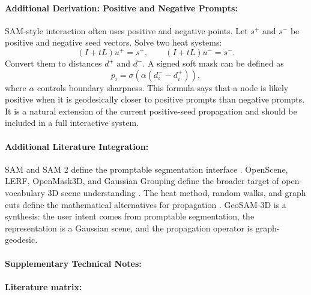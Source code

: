 \documentclass{article}
\begin{document}
\paragraph{Additional Derivation: Positive and Negative Prompts:}

SAM-style interaction often uses positive and negative points. Let $s^+$ and $s^-$ be positive and negative seed vectors. Solve two heat systems:
\begin{equation}
  (I+tL)u^+=s^+,\qquad (I+tL)u^-=s^-.
\end{equation}
Convert them to distances $d^+$ and $d^-$. A signed soft mask can be defined as
\begin{equation}
  p_i=\sigma\left(\alpha(d_i^- - d_i^+)\right),
\end{equation}
where $\alpha$ controls boundary sharpness. This formula says that a node is likely positive when it is geodesically closer to positive prompts than negative prompts. It is a natural extension of the current positive-seed propagation and should be included in a full interactive system.

\paragraph{Additional Literature Integration:}

SAM and SAM 2 define the promptable segmentation interface \citep{kirillov2023segment,ravi2024sam2}. OpenScene, LERF, OpenMask3D, and Gaussian Grouping define the broader target of open-vocabulary 3D scene understanding \citep{peng2023openscene,kerr2023lerf,takmaz2023openmask3d,ye2023gaussian}. The heat method, random walks, and graph cuts define the mathematical alternatives for propagation \citep{crane2013heat,grady2006random,boykov2001interactive}. GeoSAM-3D is a synthesis: the user intent comes from promptable segmentation, the representation is a Gaussian scene, and the propagation operator is graph-geodesic.

\paragraph{Supplementary Technical Notes:}

\paragraph{Literature matrix:}
\end{document}

